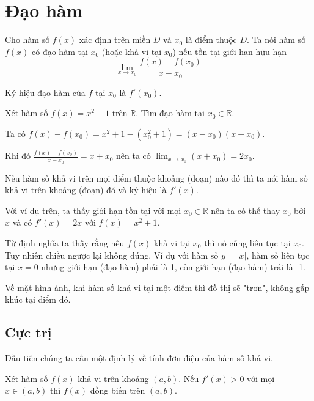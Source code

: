 \documentclass{mynotes}
\newcommand{\RR}{\mathbb{R}}
\begin{document}
\section{Đạo hàm}

\begin{definition}
    Cho hàm số $f(x)$ xác định trên miền $D$ và $x_0$ là điểm thuộc $D$. Ta nói hàm số $f(x)$ có đạo hàm tại $x_0$ (hoặc khả vi tại $x_0$) nếu tồn tại giới hạn hữu hạn
    \[\lim_{x \to x_0}\frac{f(x) - f(x_0)}{x - x_0}\]

    Ký hiệu đạo hàm của $f$ tại $x_0$ là $f'(x_0)$.
\end{definition}

\begin{example}
    Xét hàm số $f(x) = x^2 + 1$ trên $\RR$. Tìm đạo hàm tại $x_0 \in \RR$.

    Ta có $f(x)-f(x_0) = x^2 + 1 - (x_0^2 + 1) = (x - x_0) (x + x_0)$.

    Khi đó $\frac{f(x)-f(x_0)}{x-x_0} = x + x_0$ nên ta có $\displaystyle{\lim_{x \to x_0} (x + x_0) = 2 x_0}$.
\end{example}

Nếu hàm số khả vi trên mọi điểm thuộc khoảng (đoạn) nào đó thì ta nói hàm số khả vi trên khoảng (đoạn) đó và ký hiệu là $f'(x)$.

Với ví dụ trên, ta thấy giới hạn tồn tại với mọi $x_0 \in \RR$ nên ta có thể thay $x_0$ bởi $x$ và có $f'(x) = 2x$ với $f(x) = x^2 + 1$.

\begin{remark}
    Từ định nghĩa ta thấy rằng nếu $f(x)$ khả vi tại $x_0$ thì nó cũng liên tục tại $x_0$. Tuy nhiên chiều ngược lại không đúng. Ví dụ với hàm số $y = \lvert x \rvert$, hàm số liên tục tại $x=0$ nhưng giới hạn (đạo hàm) phải là 1, còn giới hạn (đạo hàm) trái là -1.
\end{remark}

Về mặt hình ảnh, khi hàm số khả vi tại một điểm thì đồ thị sẽ "trơn", không gấp khúc tại điểm đó.

\subsection*{Cực trị}

Đầu tiên chúng ta cần một định lý về tính đơn điệu của hàm số
khả vi.

\begin{theorem}
    Xét hàm số $f(x)$ khả vi trên khoảng $(a, b)$. Nếu $f'(x) > 0$ 
    với mọi $x \in (a, b)$ thì $f(x)$ đồng biến trên $(a, b)$.
\end{theorem}
\end{document}
